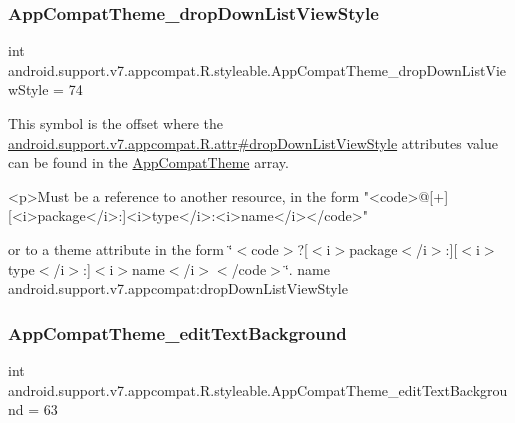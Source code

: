 \subsubsection{\texorpdfstring{App\+Compat\+Theme\+\_\+drop\+Down\+List\+View\+Style}{AppCompatTheme\_dropDownListViewStyle}}
{\footnotesize\ttfamily int android.\+support.\+v7.\+appcompat.\+R.\+styleable.\+App\+Compat\+Theme\+\_\+drop\+Down\+List\+View\+Style = 74\hspace{0.3cm}{\ttfamily [static]}}

This symbol is the offset where the \hyperlink{classandroid_1_1support_1_1v7_1_1appcompat_1_1R_1_1attr_a983f0eda5b58e2bd8586fe66c18b0ec9}{android.\+support.\+v7.\+appcompat.\+R.\+attr\#drop\+Down\+List\+View\+Style} attribute\textquotesingle{}s value can be found in the \hyperlink{classandroid_1_1support_1_1v7_1_1appcompat_1_1R_1_1styleable_a5c42f89e8a410c323be34208d75c430b}{App\+Compat\+Theme} array.

\begin{DoxyVerb}      <p>Must be a reference to another resource, in the form "<code>@[+][<i>package</i>:]<i>type</i>:<i>name</i></code>"
\end{DoxyVerb}
 or to a theme attribute in the form \char`\"{}$<$code$>$?\mbox{[}$<$i$>$package$<$/i$>$\+:\mbox{]}\mbox{[}$<$i$>$type$<$/i$>$\+:\mbox{]}$<$i$>$name$<$/i$>$$<$/code$>$\char`\"{}.  name android.\+support.\+v7.\+appcompat\+:drop\+Down\+List\+View\+Style \mbox{\label{classandroid_1_1support_1_1v7_1_1appcompat_1_1R_1_1styleable_afc8d2168bda3ebfc16b4e27ccdad5f98}} 
\subsubsection{\texorpdfstring{App\+Compat\+Theme\+\_\+edit\+Text\+Background}{AppCompatTheme\_editTextBackground}}
{\footnotesize\ttfamily int android.\+support.\+v7.\+appcompat.\+R.\+styleable.\+App\+Compat\+Theme\+\_\+edit\+Text\+Background = 63\hspace{0.3cm}{\ttfamily [static]}}

